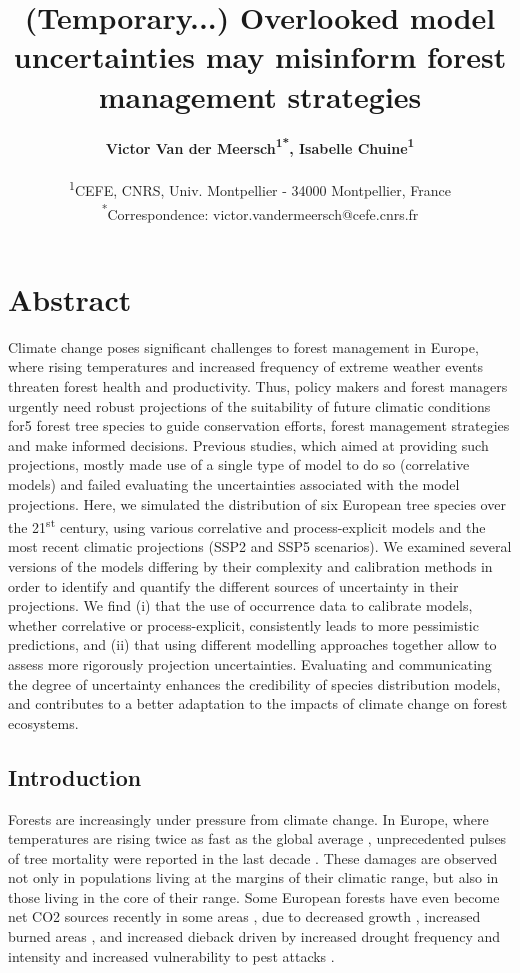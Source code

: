 \documentclass[letterpaper,8pt]{article}  %
\title{(Temporary...) Overlooked model uncertainties may misinform forest management strategies}
\author{%
\textbf{Victor Van der Meersch\textcolor{Accent}{\textsuperscript{1*}}, %
Isabelle Chuine\textcolor{Accent}{\textsuperscript{1}} %
}\\
\begin{small}\textcolor{Accent}{\textsuperscript{1}}CEFE, CNRS, Univ. Montpellier - 34000 Montpellier, France \\ 
\textcolor{Accent}{\textsuperscript{*}}Correspondence: \textcolor{Accent}{victor.vandermeersch@cefe.cnrs.fr} \\ \end{small}
}
\date{}
\begin{document}
\maketitle

\section*{Abstract}

\begin{doublespacing}
\begin{linenumbers}

Climate change poses significant challenges to forest management in Europe, where rising temperatures and increased frequency of extreme weather events threaten forest health and productivity. Thus, policy makers and forest managers urgently need robust projections of the suitability of future climatic conditions for5 forest tree species to guide conservation efforts, forest management strategies and make informed decisions. Previous studies, which aimed at providing such projections, mostly made use of a single type of model to do so (correlative models) and failed evaluating the uncertainties associated with the model projections. Here, we simulated the distribution of six European tree species over the 21\textsuperscript{st} century, using various correlative and process-explicit models and the most recent climatic projections (SSP2 and SSP5 scenarios). We examined several versions of the models differing by their complexity and calibration methods in order to identify and quantify the different sources of uncertainty in their projections. We find (i) that the use of occurrence data to calibrate models, whether correlative or process-explicit, consistently leads to more pessimistic predictions, and (ii) that using different modelling approaches together allow to assess more rigorously projection uncertainties. Evaluating and communicating the degree of uncertainty enhances the credibility of species distribution models, and contributes to a better adaptation to the impacts of climate change on forest ecosystems.

\rmfamily


\subsection{Introduction}

Forests are increasingly under pressure from climate change. In Europe, where temperatures are rising twice as fast as the global average \citep{CCCS2024}, unprecedented pulses of tree mortality were reported in the last decade \citep{Senf2020}. These damages are observed not only in populations living at the margins of their climatic range, but also in those living in the core of their range. Some European forests have even become net CO2 sources recently  in some areas \citep{Hadden2016, Karelin2021}, due to decreased growth \citep{Hadden2016, Woude2023}, increased burned areas \citep{Carnicer2022, Kelly2024}, and increased dieback driven by increased drought frequency and intensity and increased vulnerability to pest attacks \citep{Karelin2021, Cienciala2024, Latifovic2024}.


\end{linenumbers}
\end{doublespacing}
\end{document}
